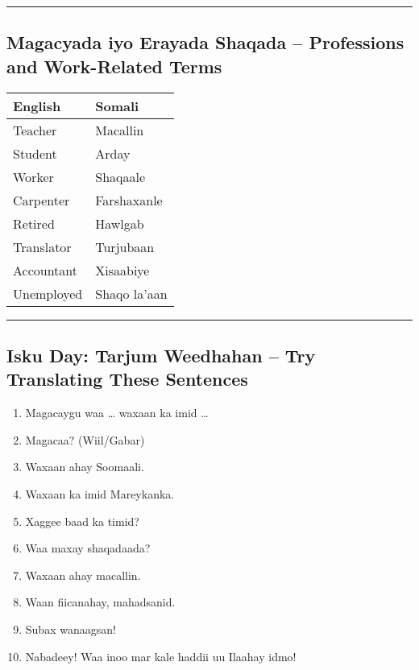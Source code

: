 \documentclass[
  a4paper,
  DIV=11,
  numbers=noendperiod]{scrartcl}
\providecommand{\tightlist}{%
  \setlength{\itemsep}{0pt}\setlength{\parskip}{0pt}}
\begin{document}
\begin{center}\rule{0.5\linewidth}{0.5pt}\end{center}

\subsection{Magacyada iyo Erayada Shaqada -- Professions and
Work-Related
Terms}\label{magacyada-iyo-erayada-shaqada-professions-and-work-related-terms}

\begin{longtable}[]{@{}ll@{}}
\toprule\noalign{}
English & Somali \\
\midrule\noalign{}
\endhead
\bottomrule\noalign{}
\endlastfoot
Teacher & Macallin \\
Student & Arday \\
Worker & Shaqaale \\
Carpenter & Farshaxanle \\
Retired & Hawlgab \\
Translator & Turjubaan \\
Accountant & Xisaabiye \\
Unemployed & Shaqo la'aan \\
\end{longtable}

\begin{center}\rule{0.5\linewidth}{0.5pt}\end{center}

\subsection{Isku Day: Tarjum Weedhahan -- Try Translating These
Sentences}\label{isku-day-tarjum-weedhahan-try-translating-these-sentences}

\begin{enumerate}
\def\labelenumi{\arabic{enumi}.}
\tightlist
\item
  Magacaygu waa \ldots{} waxaan ka imid \ldots{}
\item
  Magacaa? (Wiil/Gabar)
\item
  Waxaan ahay Soomaali.
\item
  Waxaan ka imid Mareykanka.
\item
  Xaggee baad ka timid?
\item
  Waa maxay shaqadaada?
\item
  Waxaan ahay macallin.
\item
  Waan fiicanahay, mahadsanid.
\item
  Subax wanaagsan!
\item
  Nabadeey! Waa inoo mar kale haddii uu Ilaahay idmo!
\end{enumerate}
\end{document}

